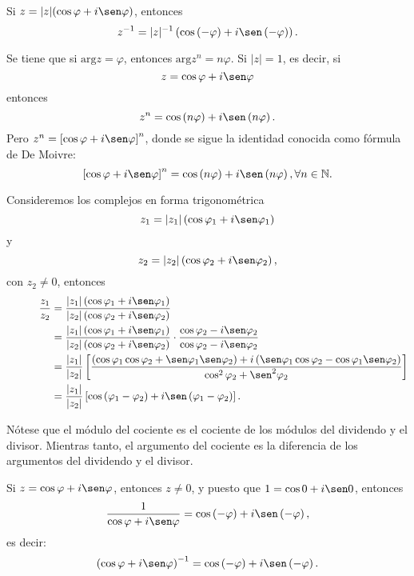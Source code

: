 \begin{corollary}
    Si $z=|z| (\cos \varphi +i \sen \varphi )$, entonces
    $$z^{-1}=|z|^{-1} \left(\cos \left(-\varphi \right)+i \sen \left( -\varphi \right) \right).$$
\end{corollary}

Se tiene que si $\textrm{arg}  z=\varphi$, entonces $\textrm{arg}  z^n=n\varphi$. Si $|z|=1$, es decir, si
$$z=\cos \varphi +i \sen \varphi$$
entonces
$$z^n=\cos \left( n \varphi \right)+i \sen \left( n\varphi \right).$$
Pero $z^n=\left[ \cos \varphi +i \sen \varphi \right]^n$, donde se sigue la identidad conocida como fórmula de De Moivre:
$$\left[ \cos \varphi +i \sen \varphi \right]^n= \cos \left( n\varphi \right) +i \sen \left( n \varphi \right),  \forall n \in \mathbb{N}.$$

Consideremos los complejos en forma trigonométrica
$$z_1=|z_1| \left( \cos \varphi _1+i \sen \varphi _1 \right)$$
y
$$z_2=|z_2| \left( \cos \varphi _2+i \sen \varphi _2 \right),$$
con $z_2 \neq 0$, entonces
\begin{align*}
    \quad\quad\quad\frac{z_1}{z_2} &= \frac{|z_1| \left( \cos \varphi _1 +i \sen \varphi _1 \right)}{|z_2| \left( \cos \varphi _2 +i \sen \varphi _2 \right)} \\
    &=\frac{|z_1| \left( \cos \varphi _1 +i \sen \varphi _1 \right)}{|z_2| \left( \cos \varphi _2 +i \sen \varphi _2 \right)} \cdot \frac{\cos \varphi _2 - i \sen \varphi _2}{\cos \varphi _2 -i \sen \varphi _2} \\
    &= \frac{|z_1|}{|z_2|} \left[ \frac{ \left( \cos \varphi _1 \cos \varphi _2 + \sen \varphi _1 \sen \varphi _2 \right) + i \left( \sen \varphi _1 \cos \varphi _2 - \cos \varphi _1 \sen \varphi _2 \right)}{\cos ^2 \varphi _2 + \sen ^2 \varphi _2} \right] \\
    &= \frac{|z_1|}{|z_2|} \left[ \cos \left( \varphi _1 - \varphi _2 \right) + i \sen \left( \varphi _1 - \varphi _2 \right) \right].
\end{align*}

Nótese que el módulo del cociente es el cociente de los módulos del dividendo y el divisor. Mientras tanto, el argumento del cociente es la diferencia de los argumentos del dividendo y el divisor.

Si $z=\cos \varphi +i \sen \varphi $, entonces $z \neq 0$, y puesto que $1=\cos 0 +i \sen 0$, entonces
$$\frac{1}{\cos \varphi +i \sen \varphi} = \cos \left( - \varphi \right)+i \sen \left( -\varphi \right),$$
es decir:
$$\left( \cos \varphi +i \sen \varphi \right)^{-1}=\cos \left( - \varphi \right)+i \sen \left( -\varphi \right).$$

